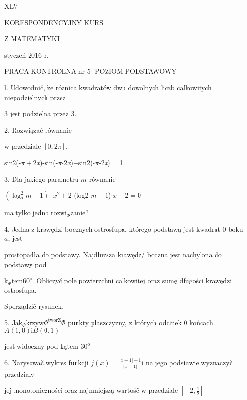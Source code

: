 \documentclass[a4paper,12pt]{article}
\begin{document}
XLV

KORESPONDENCYJNY KURS

Z MATEMATYKI

styczeń 2016 r.

PRACA KONTROLNA nr 5- POZIOM PODSTAWOWY

l. Udowodnič, $\dot{\mathrm{z}}\mathrm{e}$ róznica kwadratów dwu dowolnych liczb całkowitych niepodzielnych przez

3 jest podzielna przez 3.

2. Rozwiązač równanie

$\mathrm{w}$ przedziale $[0,2\pi].$

sin2(-$\pi+$2{\it x})-sin(-$\pi$-2{\it x})$+$sin2(-$\pi$-2{\it x})$=$1

3. Dla jakiego parametru $m$ równanie

$(\log_{2}^{2}m-1)\cdot x^{2}+2$ (log2 $m-1$)$\cdot x+2=0$

ma tylko jedno $\mathrm{r}\mathrm{o}\mathrm{z}\mathrm{w}\mathrm{i}_{\Phi}\mathrm{z}\mathrm{a}\mathrm{n}\mathrm{i}\mathrm{e}$?

4. Jedna $\mathrm{z}$ krawędzi bocznych ostrosfupa, którego podstawą jest kwadrat $0$ boku $a$, jest

prostopadła do podstawy. Najdluzsza krawędz/ boczna jest nachylona do podstawy pod

$\mathrm{k}_{\Phi}\mathrm{t}\mathrm{e}\mathrm{m}60^{\mathrm{o}}$. Obliczyč pole powierzchni calkowitej oraz sumę dfugości krawędzi ostrosfupa.

Sporządzič rysunek.

5. $\mathrm{J}\mathrm{a}\mathrm{k}_{\Phi}\mathrm{k}\mathrm{r}\mathrm{z}\mathrm{y}\mathrm{w}\Phi^{\mathrm{t}\mathrm{w}\mathrm{o}\mathrm{r}\mathrm{Z}}\Phi$ punkty plaszczyzny, $\mathrm{z}$ których odcinek $0$ końcach $A(1,0)\mathrm{i}B(0,1)$

jest widoczny pod kątem $30^{\mathrm{o}}$

6. Narysowač wykres funkcji $f(x)=\displaystyle \frac{|x+1|-1}{|x-1|}\mathrm{i}$ na jego podstawie wyznaczyč przedzialy

jej monotoniczności oraz najmniejszą wartośč $\mathrm{w}$ przedziale $[-2,\displaystyle \frac{1}{2}]$
\end{document}
